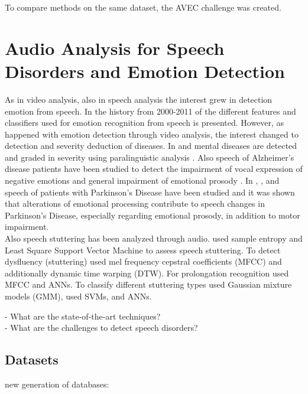 To compare methods on the same dataset, the AVEC challenge was created. \cite{Valstar2016avec}\cite{Valstar2014avec}



\section{Audio Analysis for Speech Disorders and Emotion Detection}

As in video analysis, also in speech analysis the interest grew in detection emotion from speech. In \cite{Anagnostopoulos2015survey} the history from 2000-2011 of the different features and classifiers used for emotion recognition from speech is presented. However, as happened with emotion detection through video analysis, the interest changed to detection and severity deduction of diseases. In \cite{Cummins2016} and \cite{Singh2017}mental diseases are detected and graded in severity using paralinguistic analysis . Also speech of Alzheimer's disease patients have been studied \cite{Lopez-de-Ipina2015b}\cite{Lopez-de-Ipina2014} to detect the 
impairment of vocal expression of negative emotions\cite{Zaytseva2014} \cite{Lopez-de-Ipina2015} and general impairment of emotional prosody \cite{Horley2010}. In  \cite{Schuller2015interspeech}, \cite{Moebes2008}, and \cite{Zhao2014} speech of patients with Parkinson's Disease have been studied and it was shown that alterations of emotional processing contribute to speech changes in Parkinson's Disease, especially regarding emotional prosody, in addition to motor impairment.\\

Also speech stuttering has been analyzed through audio. \cite{Hariharan2012} used sample entropy and Least Square Support Vector Machine to assess speech stuttering. To detect dysfluency (stuttering) \cite{jhawar2016speech} used mel frequency cepstral coefficients (MFCC) and \cite{Ramteke2016} additionally dynamic time warping (DTW). For prolongation recognition \cite{Chee2009} used MFCC and \cite{Savin2016} ANNs. To classify different stuttering types \cite{Mahesha2016} used Gaussian mixture models (GMM), \cite{Mahesha2015} used SVMs, and \cite{Pravin2017} ANNs.


-	What are the state-of-the-art techniques?\\
-	What are the challenges to detect speech disorders?\\

\subsection{Datasets}
new generation of databases: \cite{DouglasCowie2003}\\

